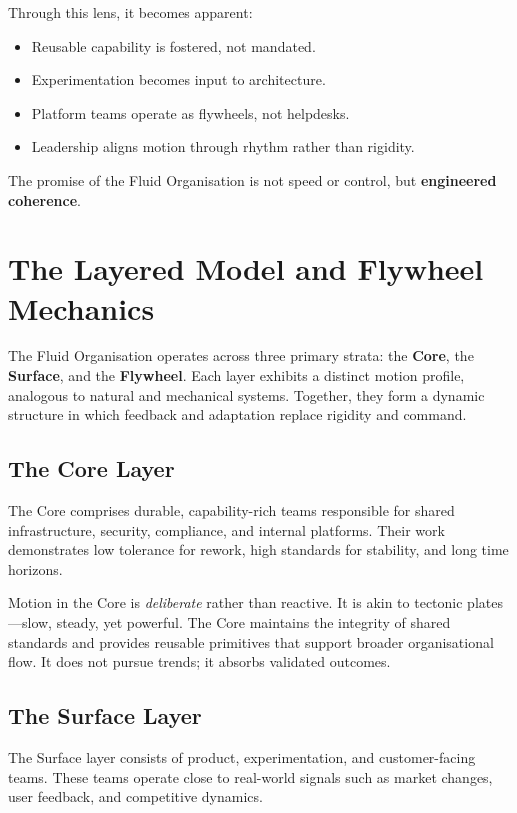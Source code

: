 \documentclass[12pt]{article}
\begin{document}
Through this lens, it becomes apparent:
\begin{itemize}
    \item Reusable capability is fostered, not mandated.
    \item Experimentation becomes input to architecture.
    \item Platform teams operate as flywheels, not helpdesks.
    \item Leadership aligns motion through rhythm rather than rigidity.
\end{itemize}

The promise of the Fluid Organisation is not speed or control, but \textbf{engineered coherence}.


\section{The Layered Model and Flywheel Mechanics}

The Fluid Organisation operates across three primary strata: the \textbf{Core}, the \textbf{Surface}, and the \textbf{Flywheel}. Each layer exhibits a distinct motion profile, analogous to natural and mechanical systems. Together, they form a dynamic structure in which feedback and adaptation replace rigidity and command.

\subsection*{The Core Layer}

The Core comprises durable, capability-rich teams responsible for shared infrastructure, security, compliance, and internal platforms. Their work demonstrates low tolerance for rework, high standards for stability, and long time horizons.

Motion in the Core is \textit{deliberate} rather than reactive. It is akin to tectonic plates—slow, steady, yet powerful. The Core maintains the integrity of shared standards and provides reusable primitives that support broader organisational flow. It does not pursue trends; it absorbs validated outcomes.

\subsection*{The Surface Layer}

The Surface layer consists of product, experimentation, and customer-facing teams. These teams operate close to real-world signals such as market changes, user feedback, and competitive dynamics.
\end{document}
